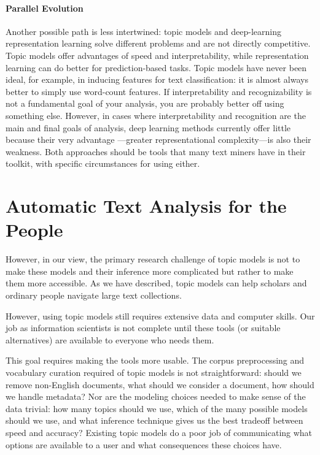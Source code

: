 \paragraph{Parallel Evolution}

Another possible path is less intertwined: topic models and
deep-learning representation learning solve different problems and 
are not directly competitive.  Topic models offer advantages of speed and
interpretability, while representation learning can do better for
prediction-based tasks. 
Topic models have never been ideal, for example, in inducing features for text classification: it is almost always better to simply use word-count features.
If interpretability and recognizability is not a fundamental goal of your analysis, you are probably better off using something else.
However, in cases where interpretability and recognition are the main and final goals of analysis, deep learning methods currently offer little because their very advantage ---greater representational complexity---is also their weakness.
Both approaches should be tools that many text
miners have in their toolkit, with specific circumstances for using
either.

\section{Automatic Text Analysis for the People}

However, in our view, the primary research challenge of topic models
is not to make these models and their inference more complicated but
rather to make them more accessible.  As we have described, topic models
can help scholars and ordinary people navigate large text collections.

However, using topic models still requires extensive data and computer
skills.  Our job as information scientists is not complete until these
tools (or suitable alternatives) are available to everyone who needs
them.

This goal requires making the tools more usable.
The corpus preprocessing and vocabulary curation required of topic models is not straightforward: should we remove
non-English documents, what should we consider a document, how should
we handle metadata?  Nor are the modeling choices needed to make sense
of the data trivial: how many topics should we use, which of the many
possible models should we use, and what inference technique gives us the
best tradeoff between speed and accuracy?  Existing topic models do a
poor job of communicating what options are available to a user and
what consequences these choices have.

